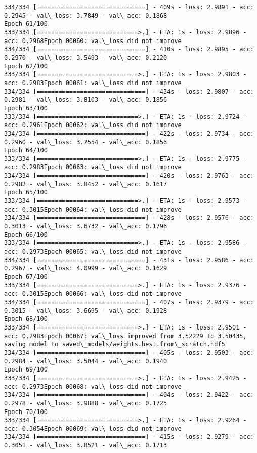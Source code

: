 \documentclass[11pt]{article}
\begin{document}
\begin{Verbatim}[commandchars=\\\{\}]
334/334 [==============================] - 409s - loss: 2.9891 - acc: 0.2945 - val\_loss: 3.7849 - val\_acc: 0.1868
Epoch 61/100
333/334 [============================>.] - ETA: 1s - loss: 2.9896 - acc: 0.2968Epoch 00060: val\_loss did not improve
334/334 [==============================] - 410s - loss: 2.9895 - acc: 0.2970 - val\_loss: 3.5493 - val\_acc: 0.2120
Epoch 62/100
333/334 [============================>.] - ETA: 1s - loss: 2.9803 - acc: 0.2983Epoch 00061: val\_loss did not improve
334/334 [==============================] - 434s - loss: 2.9807 - acc: 0.2981 - val\_loss: 3.8103 - val\_acc: 0.1856
Epoch 63/100
333/334 [============================>.] - ETA: 1s - loss: 2.9724 - acc: 0.2961Epoch 00062: val\_loss did not improve
334/334 [==============================] - 422s - loss: 2.9734 - acc: 0.2960 - val\_loss: 3.7554 - val\_acc: 0.1856
Epoch 64/100
333/334 [============================>.] - ETA: 1s - loss: 2.9775 - acc: 0.2983Epoch 00063: val\_loss did not improve
334/334 [==============================] - 420s - loss: 2.9763 - acc: 0.2982 - val\_loss: 3.8452 - val\_acc: 0.1617
Epoch 65/100
333/334 [============================>.] - ETA: 1s - loss: 2.9573 - acc: 0.3015Epoch 00064: val\_loss did not improve
334/334 [==============================] - 428s - loss: 2.9576 - acc: 0.3013 - val\_loss: 3.6732 - val\_acc: 0.1796
Epoch 66/100
333/334 [============================>.] - ETA: 1s - loss: 2.9586 - acc: 0.2973Epoch 00065: val\_loss did not improve
334/334 [==============================] - 431s - loss: 2.9586 - acc: 0.2967 - val\_loss: 4.0999 - val\_acc: 0.1629
Epoch 67/100
333/334 [============================>.] - ETA: 1s - loss: 2.9376 - acc: 0.3015Epoch 00066: val\_loss did not improve
334/334 [==============================] - 407s - loss: 2.9379 - acc: 0.3015 - val\_loss: 3.6695 - val\_acc: 0.1928
Epoch 68/100
333/334 [============================>.] - ETA: 1s - loss: 2.9501 - acc: 0.2983Epoch 00067: val\_loss improved from 3.52229 to 3.50435, saving model to saved\_models/weights.best.from\_scratch.hdf5
334/334 [==============================] - 405s - loss: 2.9503 - acc: 0.2984 - val\_loss: 3.5044 - val\_acc: 0.1940
Epoch 69/100
333/334 [============================>.] - ETA: 1s - loss: 2.9425 - acc: 0.2973Epoch 00068: val\_loss did not improve
334/334 [==============================] - 404s - loss: 2.9422 - acc: 0.2978 - val\_loss: 3.9888 - val\_acc: 0.1725
Epoch 70/100
333/334 [============================>.] - ETA: 1s - loss: 2.9264 - acc: 0.3054Epoch 00069: val\_loss did not improve
334/334 [==============================] - 415s - loss: 2.9279 - acc: 0.3051 - val\_loss: 3.8521 - val\_acc: 0.1713

\end{Verbatim}
\end{document}
